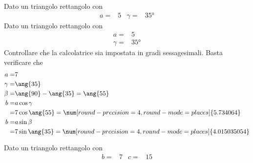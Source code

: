   \begin{exercise}
  	Dato un triangolo rettangolo con
  	\begin{align*}
  	a=&5&
  	\gamma=&\ang{35}
  	\end{align*}
  	\tcblower
  		Dato un triangolo rettangolo con
  	\begin{align*}
  	a=&5\\
  	\gamma=&\ang{35}
  	\end{align*}
  	Controllare che la calcolatrice sia impostata in gradi sessagesimali.
  	Basta verificare che \testgradi 
  	\begin{align*}
  	a=& 7\\
  	\gamma=&\ang{35}\\
  	\beta=&\ang{90}-\ang{35}=\ang{55}\\
  	b=&a\cos\gamma\\
  	=& 7\cos\ang{55}=\num[round-precision=\lungarrotandamento,round-mode=places]{5.734064}\\
  	b=&a\sin\beta\\
  	=& 7\sin\ang{35}=\num[round-precision=\lungarrotandamento,round-mode=places]{4.015035054}
  	\end{align*}
  \end{exercise}
 \begin{exercise}[no solution]
	Dato un triangolo rettangolo con
	\begin{align*}
	b=&7&
	c=&15\\
	\end{align*}
\end{exercise}
